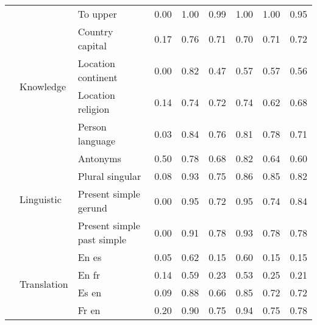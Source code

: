 \begin{center}
\begin{longtable}{lllrrrrrr}
 &  & To upper & 0.00 & 1.00 & 0.99 & 1.00 & 1.00 & 0.95 \\
\cline{2-9}
 & \multirow[t]{4}{*}{Knowledge} & Country capital & 0.17 & 0.76 & 0.71 & 0.70 & 0.71 & 0.72 \\
 &  & Location continent & 0.00 & 0.82 & 0.47 & 0.57 & 0.57 & 0.56 \\
 &  & Location religion & 0.14 & 0.74 & 0.72 & 0.74 & 0.62 & 0.68 \\
 &  & Person language & 0.03 & 0.84 & 0.76 & 0.81 & 0.78 & 0.71 \\
\cline{2-9}
 & \multirow[t]{4}{*}{Linguistic} & Antonyms & 0.50 & 0.78 & 0.68 & 0.82 & 0.64 & 0.60 \\
 &  & Plural singular & 0.08 & 0.93 & 0.75 & 0.86 & 0.85 & 0.82 \\
 &  & Present simple gerund & 0.00 & 0.95 & 0.72 & 0.95 & 0.74 & 0.84 \\
 &  & Present simple past simple & 0.00 & 0.91 & 0.78 & 0.93 & 0.78 & 0.78 \\
\cline{2-9}
 & \multirow[t]{4}{*}{Translation} & En es & 0.05 & 0.62 & 0.15 & 0.60 & 0.15 & 0.15 \\
 &  & En fr & 0.14 & 0.59 & 0.23 & 0.53 & 0.25 & 0.21 \\
 &  & Es en & 0.09 & 0.88 & 0.66 & 0.85 & 0.72 & 0.72 \\
 &  & Fr en & 0.20 & 0.90 & 0.75 & 0.94 & 0.75 & 0.78 \\
\cline{1-9} \cline{2-9}
\bottomrule
\end{longtable}

\end{center}
\twocolumn